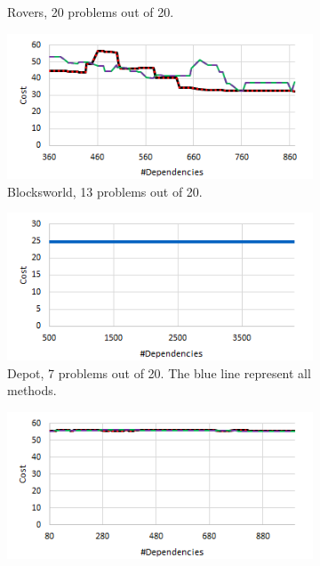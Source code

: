 \documentclass{article}
\theoremstyle{remark}
\begin{document}
{\begin{figure}[t!]
\begin{subfigure}[b]{0.3\textwidth}
  \caption{Rovers, 20 problems out of 20.}
  \label{fig:Rovers_cost}
\end{subfigure}\hspace{1em}
\begin{subfigure}[b]{0.3\textwidth}
\centering
  \includegraphics[width=1\linewidth]{Blocksworld_cost}
  \caption{Blocksworld, 13 problems out of 20.}
  \label{fig:Blocksworld_cost}
\end{subfigure}\hspace{1em}
\begin{subfigure}[b]{0.3\textwidth}
\centering
  \includegraphics[width=1\linewidth]{Depot_cost}
  \caption{Depot, 7 problems out of 20. The blue line represent all methods.}
  \label{fig:Depot_cost}
\end{subfigure}\hspace{1em}
\begin{subfigure}[b]{0.3\textwidth}
\centering
  \includegraphics[width=1\linewidth]{Zenotravel_cost}

\end{subfigure}
\end{figure}}
\end{document}
